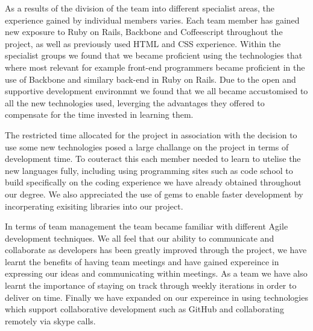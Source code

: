		As a results of the division of the team into different specialist areas, the experience gained by individual members varies. Each team member has gained new exposure to Ruby on Rails, Backbone and Coffeescript throughout the project, as well as previously used HTML and CSS experience. Within the specialist groups we found that we became proficient using the technologies that where most relevant for example front-end programmers became proficient in the use of Backbone and similary back-end in Ruby on Rails. Due to the open and supportive development environmnt we found that we all became accustomised to all the new technologies used, leverging the advantages they offered to compensate for the time invested in learning them.

		The restricted time allocated for the project in association with the decision to use some new technologies posed a large challange on the project in terms of development time. To couteract this each member needed to learn to utelise the new languages fully, including using programming sites such as code school to build specifically on the coding experience we have already obtained throughout our degree. We also appreciated the use of gems to enable faster development by incorperating exisiting libraries into our project. 

		In terms of team management the team became familiar with different Agile development techniques. We all feel that our ability to communicate and collaborate as developers has been greatly improved through the project, we have learnt the benefits of having team meetings and have gained expereince in expressing our ideas and communicating within meetings. As a team we have also learnt the importance of staying on track through weekly iterations in order to deliver on time. Finally we have expanded on our expereince in using technologies which support collaborative development such as GitHub and collaborating remotely via skype calls.
